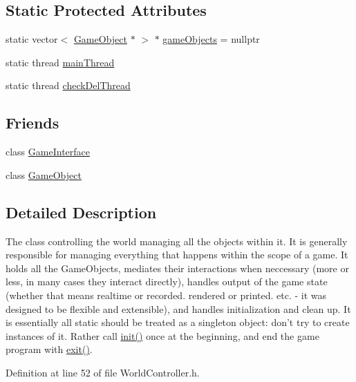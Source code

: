 \subsection*{Static Protected Attributes}
\begin{DoxyCompactItemize}
\item 
static vector$<$ \hyperlink{class_game_object}{Game\-Object} $\ast$ $>$ $\ast$ \hyperlink{class_world_controller_a2cb2ca35d201d22f296cda71b8a58e92}{game\-Objects} = nullptr
\item 
static thread \hyperlink{class_world_controller_a52eeb1fd93682db9e530ef43304ec5ef}{main\-Thread}
\item 
static thread \hyperlink{class_world_controller_ab8fb8ee7100a17d3a6237ce8ac5a15e2}{check\-Del\-Thread}
\end{DoxyCompactItemize}
\subsection*{Friends}
\begin{DoxyCompactItemize}
\item 
class \hyperlink{class_world_controller_a5b5c569791ec6a6e8df671cc07169ac9}{Game\-Interface}
\item 
class \hyperlink{class_world_controller_a00df87c957d8f7ee0fc51f07a0542f4a}{Game\-Object}
\end{DoxyCompactItemize}


\subsection{Detailed Description}
The class controlling the world managing all the objects within it. It is generally responsible for managing everything that happens within the scope of a game. It holds all the Game\-Objects, mediates their interactions when neccessary (more or less, in many cases they interact directly), handles output of the game state (whether that means realtime or recorded. rendered or printed. etc. -\/ it was designed to be flexible and extensible), and handles initialization and clean up. It is essentially all static should be treated as a singleton object\-: don't try to create instances of it. Rather call \hyperlink{class_world_controller_afbbfb68f628affc0294ba4dfae1c0f57}{init()} once at the beginning, and end the game program with \hyperlink{class_world_controller_ab02f125f52eccfc19b5c426a16236610}{exit()}. 

Definition at line 52 of file World\-Controller.\-h.



